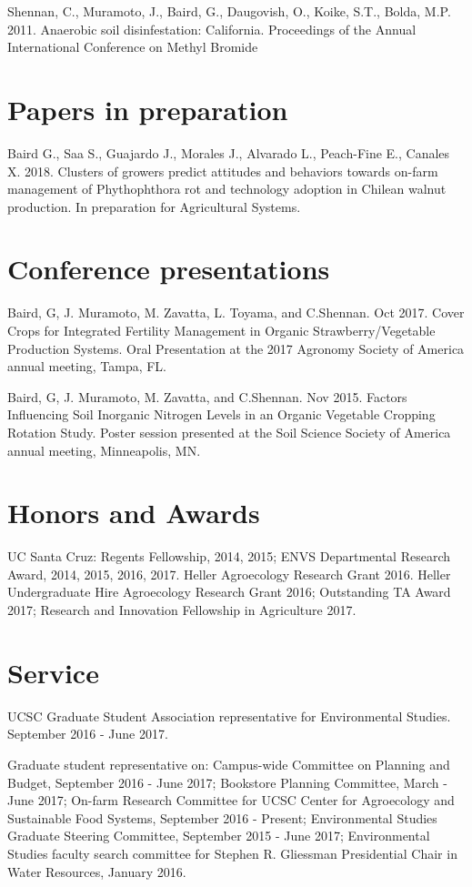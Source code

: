 \documentclass{res}
\begin{document}
\begin{resume}
		Shennan, C., Muramoto, J., Baird, G., Daugovish, O., Koike, S.T., Bolda, M.P. 2011.
		Anaerobic soil disinfestation: California. Proceedings of the Annual International Conference on Methyl Bromide   
		
		\section{\sc Papers in preparation}
		Baird G., Saa S., Guajardo J., Morales J., Alvarado L., Peach-Fine E., Canales X. 2018. Clusters of growers predict attitudes and behaviors towards on-farm management of Phythophthora rot and technology adoption in Chilean walnut production. In preparation for Agricultural Systems.

		\section{\sc Conference presentations}
		
		Baird, G, J. Muramoto, M. Zavatta, L. Toyama, and C.Shennan. Oct 2017. Cover Crops for Integrated Fertility Management in Organic Strawberry/Vegetable Production Systems. Oral Presentation at the 2017 Agronomy Society of America annual meeting, Tampa, FL. 
		
		Baird, G, J. Muramoto, M. Zavatta, and C.Shennan. Nov 2015. Factors Influencing Soil Inorganic Nitrogen Levels in an Organic Vegetable Cropping Rotation Study. Poster session presented at the Soil Science Society of America annual meeting, Minneapolis, MN.

		\section{\sc Honors and Awards} 
		UC Santa Cruz: Regents Fellowship, 2014, 2015; ENVS Departmental Research Award, 2014, 2015, 2016, 2017. Heller Agroecology Research Grant 2016. Heller Undergraduate Hire Agroecology Research Grant 2016; Outstanding TA Award 2017; Research and Innovation Fellowship in Agriculture 2017. 

		\section{\sc Service} 		
		UCSC Graduate Student Association representative for Environmental Studies. September 2016 - June 2017. 
		
		Graduate student representative on: Campus-wide Committee on Planning and Budget, September 2016 - June 2017;  Bookstore Planning Committee, March - June 2017; On-farm Research Committee for UCSC Center for Agroecology and Sustainable Food Systems, September 2016 - Present; Environmental Studies Graduate Steering Committee, September 2015 - June 2017; Environmental Studies faculty search committee for Stephen R. Gliessman Presidential Chair in Water Resources, January 2016.
		
	\end{resume}
\end{document}
